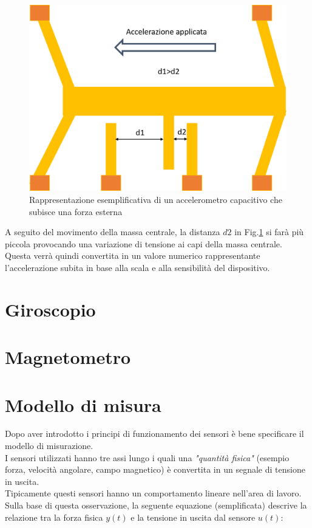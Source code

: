  \begin{figure}[H]  
	\centering 
	\includegraphics[scale=0.25 ]{tecnologie/acc2.png}
	\caption{Rappresentazione esemplificativa di un accelerometro capacitivo che subisce una forza esterna}
	\label{fig:acc2}
\end{figure}

A seguito del movimento della massa centrale, la distanza $d2$ in Fig.\ref{fig:acc2} si farà più piccola provocando una variazione di tensione ai capi della massa centrale. Questa verrà quindi convertita in un valore numerico rappresentante l'accelerazione subita in base alla scala e alla sensibilità del dispositivo.\\ 

\section{Giroscopio}
\label{giroscopi}


\section{Magnetometro}
\label{magnetometro}


\section{Modello di misura}
Dopo aver introdotto i principi di funzionamento dei sensori è bene specificare il modello di misurazione.\\
I sensori utilizzati hanno tre assi lungo i quali una \textit{"quantità fisica"} (esempio forza, velocità angolare, campo magnetico) è convertita in un segnale di tensione in uscita. \\
Tipicamente questi sensori hanno un comportamento lineare nell'area di lavoro. Sulla base di questa osservazione, la seguente equazione (semplificata) descrive la relazione tra la forza fisica $y(t)$ e la tensione in uscita dal sensore $ u(t)$:

